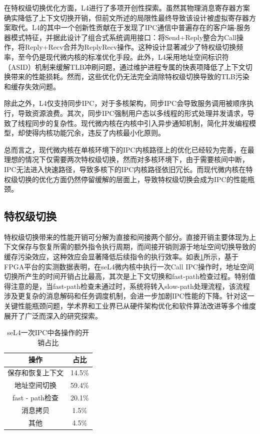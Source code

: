 在特权级切换优化方面，L4进行了多项开创性探索。虽然其物理消息寄存器方案确实降低了上下文切换开销，但前文所述的局限性最终导致该设计被虚拟寄存器方案取代\cite{heiser2016l4}。L4的其中一个创新性贡献在于发现了IPC通信中普遍存在的客户端-服务器模式特征，并据此设计了组合式系统调用接口：将Send+Reply整合为Call操作，将Reply+Recv合并为ReplyRecv操作。这种设计显著减少了特权级切换频率，至今仍是现代微内核的标准优化手段。此外，L4采用地址空间标识符（ASID）机制来缓解TLB冲刷问题\cite{arm2009asid}，通过维护进程专属的快表项降低了上下文切换带来的性能损耗。然而，这些优化仍无法完全消除特权级切换导致的TLB污染和缓存失效问题\cite{cox2017efficient}。

除此之外，L4仅支持同步IPC，对于多核架构，同步IPC会导致服务调用被顺序执行，导致资源浪费\cite{kuang2013towards}。其次，同步IPC强制用户态以多线程的形式处理并发请求，导致了线程同步的复杂性。现代微内核在内核中引入异步通知机制，简化并发编程模型，却使得内核功能冗余，违反了内核最小化原则。

总而言之，现代微内核在单核环境下的IPC内核路径上的优化已经较为完善，在最理想的情况下仅需要两次特权级切换，然而对多核环境下，由于需要核间中断，IPC无法进入快速路径，导致多核下的IPC内核路径依旧冗长。而现代微内核在特权级切换的优化方面仍然停留缓解的层面上，导致特权级切换会成为IPC的性能瓶颈。

\subsection{特权级切换}
特权级切换带来的性能开销可分解为直接和间接两个部分\cite{li2007quantifying}。直接开销主要体现为上下文保存与恢复所需的额外指令执行周期，而间接开销则源于地址空间切换导致的缓存污染效应\cite{gotzfried2017cache}，这种效应会显著降低后续指令的执行效率。如表\ref{tab:seL4_call_cost}所示，基于FPGA平台的实测数据表明，在seL4微内核中执行一次Call IPC操作时，地址空间切换所产生的时间开销占比最高，其次是上下文切换和fast-path检查过程。特别值得注意的是，当fast-path检查未通过时，系统将转入slow-path处理流程，该流程涉及更复杂的消息解码和任务调度机制，会进一步加剧IPC性能的下降。针对这一关键性能瓶颈问题，学术界和工业界已从硬件架构优化和软件算法改进等多个维度展开了广泛而深入的研究探索。
\begin{table}
    \centering
    \begin{tabular}{|c|c|}
        \hline 
        操作 & 占比 \\
        \hline
        保存和恢复上下文 & 14.5\% \\
        \hline
        地址空间切换 & 59.4\% \\
        \hline
        fast - path检查 & 20.1\% \\
        \hline
        消息拷贝 & 1.5\% \\
        \hline
        其他 & 4.5\% \\
        \hline
    \end{tabular}
    \caption{seL4一次IPC中各操作的开销占比}
    \label{tab:seL4_call_cost}
\end{table}
    
